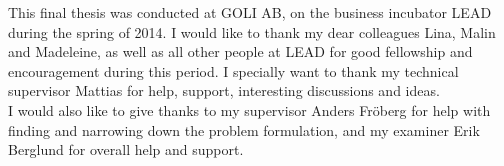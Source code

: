 This final thesis was conducted at GOLI AB, on the business incubator
LEAD during the spring of 2014. I would like to thank my dear colleagues
Lina, Malin and Madeleine, as well as all other people at LEAD for good
fellowship and encouragement during this period. I specially want to
thank my technical supervisor Mattias for help, support, interesting
discussions and ideas.\\

I would also like to give thanks to my supervisor Anders Fröberg for
help with finding and narrowing down the problem formulation, and my
examiner Erik Berglund for overall help and support.\\
